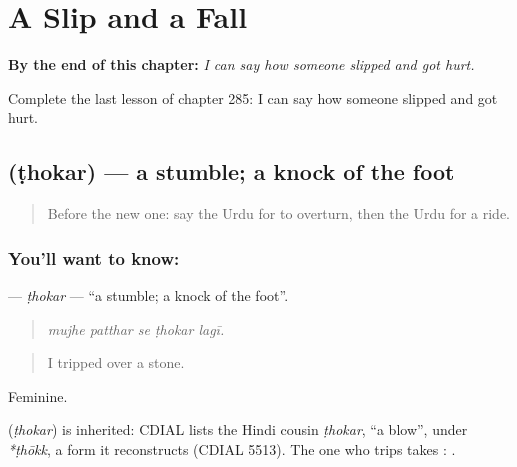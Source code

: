 
\chapter{A Slip and a Fall}
\label{ch:ur-a-slip-and-a-fall}

\begin{chapteropening}
\textbf{By the end of this chapter:} \emph{I can say how someone slipped and got hurt.}

Complete the last lesson of chapter 285: I can say how someone slipped and got hurt.
\end{chapteropening}

\section[\texorpdfstring{\ur{ٹھوکر} (ṭhokar)}{ٹھوکر (ṭhokar)}]{ (ṭhokar) — a stumble; a knock of the foot}

\label{lesson:UR-C285-thokar}



\begin{quote}
Before the new one: say the Urdu for to overturn, then the Urdu for a ride.
\end{quote}

\subsection*{You'll want to know: }
\textbf{} — \emph{ṭhokar} — \textquotedblleft{}a stumble; a knock of the foot\textquotedblright{}.

\begin{quote}
    
\end{quote}

\begin{quote}
\emph{mujhe patthar se ṭhokar lagī.}
\end{quote}

\begin{quote}
I tripped over a stone.
\end{quote}

Feminine.

\begin{cousinweb}
\textbf{} (\emph{ṭhokar}) is inherited: CDIAL lists the Hindi cousin \emph{ṭhokar}, \textquotedblleft{}a blow\textquotedblright{}, under \emph{*ṭhōkk}, a form it reconstructs (CDIAL 5513). The one who trips takes \textbf{}: \textbf{  }.
\end{cousinweb}

